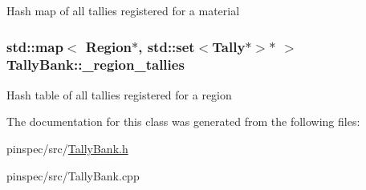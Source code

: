 Hash map of all tallies registered for a material \hypertarget{classTallyBank_a10180395facd4f1d39d8aa7cf81c6789}{
\subsubsection[{\-\_\-region\-\_\-tallies}]{\setlength{\rightskip}{0pt plus 5cm}std\-::map$<$ {\bf Region}$\ast$, std\-::set$<${\bf Tally}$\ast$$>$$\ast$ $>$ Tally\-Bank\-::\-\_\-region\-\_\-tallies\hspace{0.3cm}{\ttfamily [private]}}}\label{classTallyBank_a10180395facd4f1d39d8aa7cf81c6789}
Hash table of all tallies registered for a region 

The documentation for this class was generated from the following files\-:\begin{DoxyCompactItemize}
\item 
pinspec/src/\hyperlink{TallyBank_8h}{Tally\-Bank.\-h}\item 
pinspec/src/Tally\-Bank.\-cpp\end{DoxyCompactItemize}
